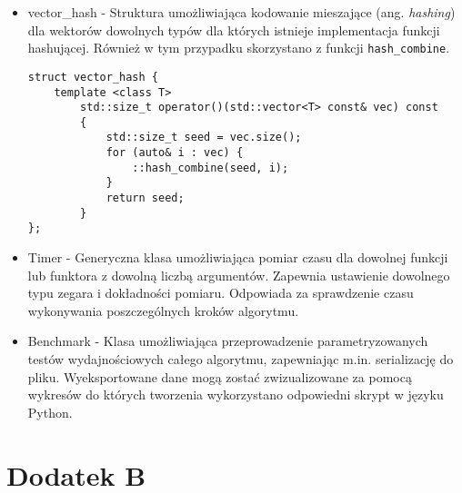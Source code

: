 \documentclass[12pt]{article}
\def\inline{\lstinline[basicstyle=\ttfamily,keywordstyle={}]}
\begin{document}
\begin{itemize}
\item vector\_hash - Struktura umożliwiająca kodowanie mieszające (ang. \textit{hashing}) dla wektorów dowolnych typów dla których istnieje implementacja funkcji hashującej. Również w tym przypadku skorzystano z funkcji \inline{hash_combine}.

\begin{minipage}{\linewidth}
\begin{lstlisting}[caption={Kod struktury vector\_hash}]
struct vector_hash {
	template <class T>
		std::size_t operator()(std::vector<T> const& vec) const 
        {
            std::size_t seed = vec.size();
            for (auto& i : vec) {
                ::hash_combine(seed, i);
            }
			return seed;
		}
};
\end{lstlisting}
\end{minipage}


\item Timer - Generyczna klasa umożliwiająca pomiar czasu dla dowolnej funkcji lub funktora z dowolną liczbą argumentów. Zapewnia ustawienie dowolnego typu zegara i dokładności pomiaru. Odpowiada za sprawdzenie czasu wykonywania poszczególnych kroków algorytmu.

\item Benchmark - Klasa umożliwiająca przeprowadzenie parametryzowanych testów wydajnościowych całego algorytmu, zapewniając m.in. serializację do pliku. Wyeksportowane dane mogą zostać zwizualizowane za pomocą wykresów do których tworzenia wykorzystano odpowiedni skrypt w języku Python.

\end{itemize}

\section{Dodatek B}
\end{document}
